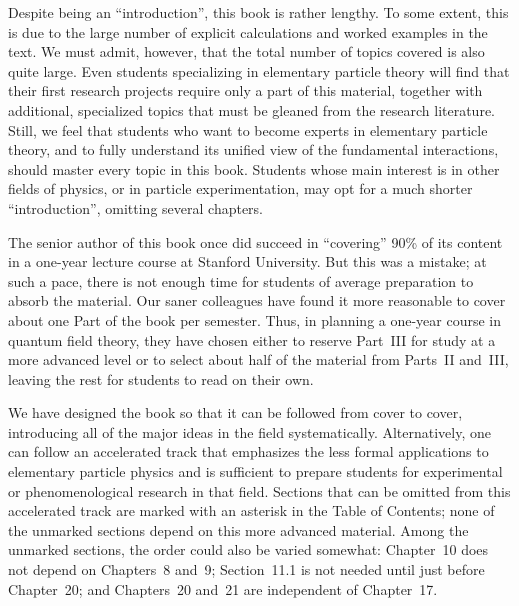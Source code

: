 Despite being an ``introduction'', this book is rather lengthy.  To some
extent, this is due to the large number of explicit calculations and
worked examples in the text.  We must admit, however, that the total
number of topics covered is also quite large.  Even students specializing
in elementary particle theory will find that their first research projects
require only a part of this material, together with additional,
specialized topics that must be gleaned from the research literature.
Still, we feel that students who want to become experts in elementary
particle theory, and to fully understand its unified view of the
fundamental interactions, should master every topic in this book.  Students
whose main interest is in other fields of physics, or in particle
experimentation, may opt for a much shorter ``introduction'', omitting
several chapters.

The senior author of this book once did succeed in ``covering'' 90\% of
its content in a one-year lecture course at Stanford University.  But this
was a mistake; at such a pace, there is not enough time for students of
average preparation to absorb the material.  Our saner colleagues have
found it more reasonable to cover about one Part of the book per semester.
Thus, in planning a one-year course in quantum field theory, they have
chosen either to reserve Part~III for study at a more advanced level or to
select about half of the material from Parts~II and~III, leaving the rest
for students to read on their own.

We have designed the book so that it can be followed from cover to cover,
introducing all of the major ideas in the field systematically.
Alternatively, one can follow an accelerated track that emphasizes the
less formal applications to elementary particle physics and is sufficient
to prepare students for experimental or phenomenological research in that
field.  Sections that can be omitted from this accelerated track are
marked with an asterisk in the Table of Contents; none of the unmarked
sections depend on this more advanced material.  Among the unmarked
sections, the order could also be varied somewhat: Chapter~10 does not
depend on Chapters~8 and~9; Section~11.1 is not needed until just before
Chapter~20; and Chapters~20 and~21 are independent of Chapter~17.

